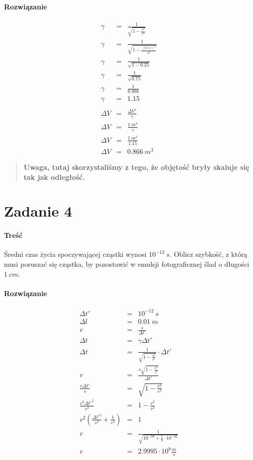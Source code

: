 \documentclass [a4paper, 11pt, oneside]{book}
\begin{document}
		\paragraph{Rozwiązanie}
		\begin{eqnarray*}
			\gamma & = & \frac{1}{\sqrt{1-\frac{v^2}{c^2}}}\\
			\gamma & = & \frac{1}{\sqrt{1-\frac{(0.5~c)^2}{c^2}}}\\
			\gamma & = & \frac{1}{\sqrt{1-0.25}}\\
			\gamma & = & \frac{1}{\sqrt{0.75}}\\
			\gamma & = & \frac{1}{0.866}\\
			\gamma & = & 1.15\\ \\
			\Delta V & = & \frac{\Delta V'}{\gamma}\\
			\Delta V & = & \frac{1~m^3}{\gamma}\\
			\Delta V & = & \frac{1~m^3}{1.15}\\
			\Delta V & = & 0.866~m^3
		\end{eqnarray*}
		\begin{quote}
			\bf Uwaga, tutaj skorzystaliśmy z tego, że objętość bryły skaluje się tak jak odległość.
		\end{quote}
	
	\section{Zadanie 4} %
	\label{sec:zadanie_4}
		\paragraph{Treść}Średni czas życia spoczywającej cząstki wynosi $10^{-12}~s$. Oblicz szybkość, z którą musi poruszać się cząstka, by pozostawić w emulsji fotograficznej ślad o długości $1~cm$.
		\paragraph{Rozwiązanie}
		\begin{eqnarray*}
			\Delta t' &=& 10^{-12}~s\\
			\Delta l & = & 0.01~m\\
			v &=& \frac{s}{\Delta t'}\\
			\Delta t &=& \gamma\Delta t'\\
			\Delta t &=& \frac{1}{\sqrt{1-\frac{v^2}{c^2}}}\cdot\Delta t'\\
			v &=& \frac{s\sqrt{1-\frac{v^2}{c^2}}}{\Delta t'}\\
			\frac{v\Delta t'}{s} &=& \sqrt{1-\frac{v^2}{c^2}}\\
			\frac{v^2\Delta t'^2}{s^2} &=& 1-\frac{v^2}{c^2}\\
			v^2(\frac{\Delta l'^2}{s^2} + \frac{1}{c^2}) &=& 1\\
			v &=& \frac{1}{\sqrt{10^{-20}+\frac19\cdot10^{-16}}}\\
			v & = & 2.9995\cdot10^8\frac{m}{s}
		\end{eqnarray*}
\end{document}
